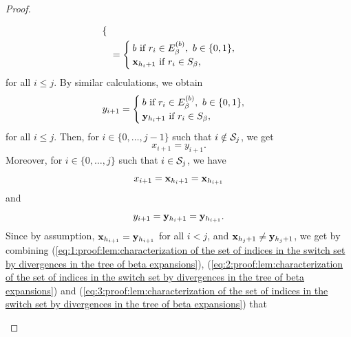 \begin{proof}
\begin{enumerate}[label = (\alph*)]
\begin{align}
\begin{cases}
            \end{cases}\\
            &= \label{eq:0:proof:lem:characterization of the set of indices in the switch set by divergences in the tree of beta expansions} \begin{cases}
                b \ \text{if} \ r_i \in E_\beta^{(b)}, \ b \in \{0,1\},\\
                {\bf x}_{h_i+1} \ \text{if} \ r_i \in S_\beta,
            \end{cases}
        \end{align}
        for all $i \leq j$. By similar calculations, we obtain 
        \begin{equation}
            y_{i+1} = \begin{cases}
                b \ \text{if} \ r_i \in E_\beta^{(b)}, \ b \in \{0,1\},\\
                {\bf y}_{h_i+1} \ \text{if} \ r_i \in S_\beta,
            \end{cases}
        \end{equation}
        for all $i \leq j$. Then, for $i \in \{0, \ldots, j-1\}$ such that $i \notin \mathcal{S}_j$, we get 
        \begin{equation}\label{eq:1:proof:lem:characterization of the set of indices in the switch set by divergences in the tree of beta expansions}
            x_{i+1} = y_{i+1}.
        \end{equation}
        Moreover, for $i \in \{0, \ldots, j\}$ such that $i \in \mathcal{S}_j$, we have
        \begin{equation}\label{eq:2:proof:lem:characterization of the set of indices in the switch set by divergences in the tree of beta expansions}
            x_{i+1} = {\bf x}_{h_i+1} = {\bf x}_{h_{i+1}}
        \end{equation}
        and 
        \begin{equation}\label{eq:3:proof:lem:characterization of the set of indices in the switch set by divergences in the tree of beta expansions}
            y_{i+1} = {\bf y}_{h_i+1} = {\bf y}_{h_{i+1}}.
        \end{equation}
        Since by assumption, ${\bf x}_{h_{i+1}} = {\bf y}_{h_{i+1}}$ for all $i < j$, and ${\bf x}_{h_{j}+1} \neq {\bf y}_{h_{j}+1}$, we get by combining (\ref{eq:1:proof:lem:characterization of the set of indices in the switch set by divergences in the tree of beta expansions}), (\ref{eq:2:proof:lem:characterization of the set of indices in the switch set by divergences in the tree of beta expansions}) and (\ref{eq:3:proof:lem:characterization of the set of indices in the switch set by divergences in the tree of beta expansions}) that

\end{enumerate}
\end{proof}
